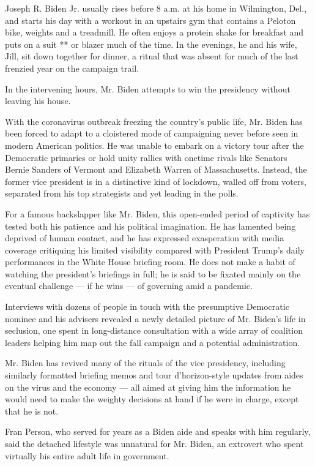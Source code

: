 Joseph R. Biden Jr. usually rises before 8 a.m. at his home in
Wilmington, Del., and starts his day with a workout in an upstairs gym
that contains a Peloton bike, weights and a treadmill. He often enjoys a
protein shake for breakfast and puts on a suit ** or blazer much of the
time. In the evenings, he and his wife, Jill, sit down together for
dinner, a ritual that was absent for much of the last frenzied year on
the campaign trail.

In the intervening hours, Mr. Biden attempts to win the presidency
without leaving his house.

With the coronavirus outbreak freezing the country's public life, Mr.
Biden has been forced to adapt to a cloistered mode of campaigning never
before seen in modern American politics. He was unable to embark on a
victory tour after the Democratic primaries or hold unity rallies with
onetime rivals like Senators Bernie Sanders of Vermont and Elizabeth
Warren of Massachusetts. Instead, the former vice president is in a
distinctive kind of lockdown, walled off from voters, separated from his
top strategists and yet leading in the polls.

For a famous backslapper like Mr. Biden, this open-ended period of
captivity has tested both his patience and his political imagination. He
has lamented being deprived of human contact, and he has expressed
exasperation with media coverage critiquing his limited visibility
compared with President Trump's daily performances in the White House
briefing room. He does not make a habit of watching the president's
briefings in full; he is said to be fixated mainly on the eventual
challenge --- if he wins --- of governing amid a pandemic.

Interviews with dozens of people in touch with the presumptive
Democratic nominee and his advisers revealed a newly detailed picture of
Mr. Biden's life in seclusion, one spent in long-distance consultation
with a wide array of coalition leaders helping him map out the fall
campaign and a potential administration.

Mr. Biden has revived many of the rituals of the vice presidency,
including similarly formatted briefing memos and tour d'horizon-style
updates from aides on the virus and the economy --- all aimed at giving
him the information he would need to make the weighty decisions at hand
if he were in charge, except that he is not.

Fran Person, who served for years as a Biden aide and speaks with him
regularly, said the detached lifestyle was unnatural for Mr. Biden, an
extrovert who spent virtually his entire adult life in government.

